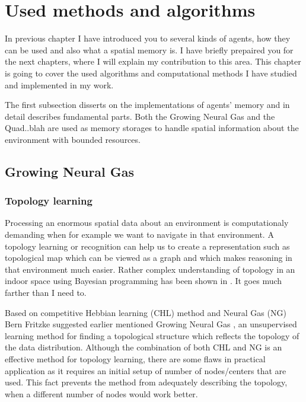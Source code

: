 \chapter{Used methods and algorithms}

In previous chapter I have introduced you to several kinds of agents, how they can be used and also what a spatial memory is. I have briefly prepaired you for the next chapters, where I will explain my contribution to this area. This chapter is going to cover the used algorithms and computational methods I have studied and implemented in my work. 

The first subsection disserts on the implementations of agents' memory and in detail describes fundamental parts. Both the Growing Neural Gas and the Quad..blah are used as memory storages to handle spatial information about the environment with bounded resources.

\section{Growing Neural Gas}   
\label{usedalgo:gng}

\subsection{Topology learning}

Processing an enormous spatial data about an environment is computationaly demanding when for example we want to navigate in that environment. A topology learning or recognition can help us to create a representation such as topological map which can be viewed as a graph and which makes reasoning in that environment much easier. Rather complex understanding of topology in an indoor space using Bayesian programming has been shown in \cite{Tapus:topologylearning}. It goes much farther than I need to. 

Based on competitive Hebbian learning (CHL) method \cite{Martinetz:chl} and Neural Gas (NG) \cite{Martinetz:ng} Bern Fritzke suggested earlier mentioned Growing Neural Gas \cite{Fritzke:gng}, an unsupervised learning method for finding a topological structure which reflects the topology of the data distribution. Although the combination of both CHL and NG is an effective method for topology learning, there are some flaws in practical application as it requires an initial setup of number of nodes/centers that are used. This fact prevents the method from adequately describing the topology, when a different number of nodes would work better.

